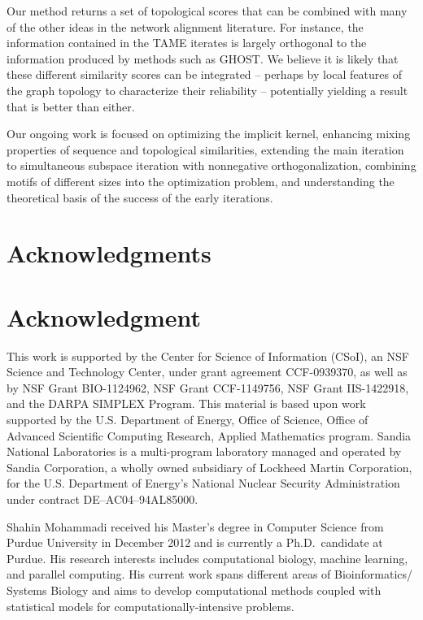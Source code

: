 \documentclass[10pt, journal, compsoc, final]{IEEEtran}
\begin{document}
Our method returns a set of topological scores that can be combined with many 
of the other ideas in the network alignment literature. For instance, the information
contained in the TAME iterates is largely orthogonal to the information produced by
methods such as GHOST. We believe it is likely that these different similarity
scores can be integrated -- perhaps by local features of the graph topology
to characterize their reliability -- potentially yielding a result that is
better than either. 

Our ongoing work is focused on optimizing the implicit kernel, enhancing mixing properties of 
sequence and topological similarities, extending the main iteration to simultaneous subspace 
iteration with nonnegative orthogonalization, combining motifs of different sizes into the 
optimization problem, and understanding the theoretical basis of the success
of the early iterations.






\ifCLASSOPTIONcompsoc
\section*{Acknowledgments}
\else
\section*{Acknowledgment}
\fi

This work is supported by the Center for Science of Information (CSoI), an NSF Science and 
Technology Center, under grant agreement CCF-0939370, as well as by NSF Grant BIO-1124962,
NSF Grant CCF-1149756, NSF Grant IIS-1422918, and the DARPA SIMPLEX Program.
This material is based upon work supported by the U.S. Department of
Energy, Office of Science, Office of Advanced Scientific Computing
Research, Applied Mathematics program.
Sandia National Laboratories is a multi-program laboratory managed and
operated by Sandia Corporation, a wholly owned subsidiary of Lockheed
Martin Corporation, for the U.S. Department of Energy's National
Nuclear Security Administration under contract DE--AC04--94AL85000.

\ifCLASSOPTIONcaptionsoff
  \newpage
\fi







\printbibliography

\begin{IEEEbiography}{Shahin Mohammadi}  received his Master's degree in Computer Science from Purdue University in December 2012 and is currently a Ph.D.~candidate at Purdue. His research interests includes computational biology, machine learning, and parallel computing. His current work spans different areas of Bioinformatics/ Systems Biology and aims to develop computational methods coupled with statistical models for computationally-intensive problems.
\end{IEEEbiography}
\end{document}
